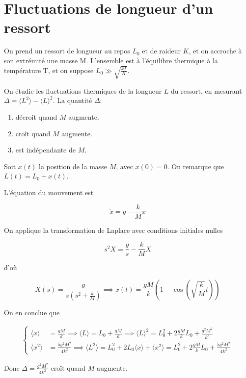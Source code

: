 \documentclass[french]{article}
\begin{document}
	\section{Fluctuations de longueur d'un ressort}
	\begin{tcolorbox}[colback=blue!5!white,colframe=blue!75!black]
	\quad On prend un ressort de longueur au repos $L_0$ et de raideur $K$, et on accroche à son extrémité une masse M. L'ensemble est à l'équilibre thermique à la température T, et on suppose $L_0 \gg \sqrt{\frac{kT}{K}}$.
	
	\quad On étudie les fluctuations thermiques de la longueur $L$ du ressort, en mesurant $\Delta = \langle L^2 \rangle - \langle L \rangle^2$. La quantité $\Delta$:
	\begin{enumerate}
		\item décroit quand $M$ augmente.
		\item croît quand $M$ augmente.
		\item est indépendante de $M$.
	\end{enumerate}
	\end{tcolorbox}

	Soit $x(t)$ la position de la masse $M$, avec $x(0) = 0$. On remarque que $L(t) = L_0 + x(t)$.

	L'équation du mouvement est
	
	$$ \ddot{x} = g - \frac{k}{M} x $$
	
	On applique la transformation de Laplace avec conditions initiales nulles
	
	$$ s^2 X = \frac{g}{s} - \frac{k}{M}X $$
	
	d'où
	
	$$ X(s) = \frac{g}{s \left(s^2 + \frac{k}{M}\right)} \implies x(t) = \frac{gM}{k}\left( 1 - \cos\left(\sqrt{\frac{k}{M}} t \right) \right)  $$
	
	On en conclue que 
	
	\begin{align}
		\begin{cases}
		\langle x \rangle &= \frac{gM}{k} \implies \langle L \rangle = L_0 + \frac{gM}{k} \implies \langle L \rangle^2 = L_0^2 + 2\frac{gM}{k}L_0 + \frac{g^2M^2}{k^2} \\
		\langle x^2 \rangle &= \frac{5g^2M^2}{4k^2} \implies \langle L^2 \rangle = L_0^2 + 2L_0\langle x \rangle + \langle x^2 \rangle = L_0^2 + 2\frac{gM}{k}L_0 + \frac{5g^2M^2}{4k^2}
		\end{cases}
	\end{align}
	
	Donc $\Delta = \frac{g^2M^2}{4k^2}$ croît quand $M$ augmente.
	
\end{document}
